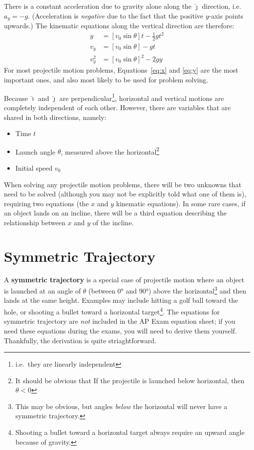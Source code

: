 \documentclass{../../../oss-handout}
\newcommand{\iii}{\bm{\hat{\imath}}}
\newcommand{\jjj}{\bm{\hat{\jmath}}}
\begin{document}
There is a constant acceleration due to gravity alone along the $\jjj$
direction, i.e.\ $a_y=-g$. (Acceleration is \emph{negative} due to the fact that
the positive $y$-axis points upwards.) The kinematic equations along the
vertical direction are therefore:
\begin{align}
  y &= \left[v_0\sin\theta\right]t-\frac12gt^2\label{eq:y}\\
  v_y &= \left[v_0\sin\theta\right] -gt\\
  v_y^2&=\left[v_0\sin\theta\right]^2-2gy
\end{align}
For most projectile motion problems, Equations~\ref{eq:x} and \ref{eq:y} are
the most important ones, and also most likely to be used for problem solving.

Because $\iii$ and $\jjj$ are perpendicular\footnote{i.e.\ they are linearly
  independent}, horizontal and vertical motions are completely independent of
each other. However, there are variables that are shared in both directions,
namely:
\begin{itemize}[nosep]
\item Time $t$
\item Launch angle $\theta$, measured above the horizontal\footnote{It should
  be obvious that If the projectile is launched below horizontal, then
  $\theta<0$}
\item Initial speed $v_0$
\end{itemize}
When solving any projectile motion problems, there will be two unknowns that
need to be solved (although you may not be explicitly told what one of them
is), requiring two equations (the $x$ and $y$ kinematic equations). In some
rare cases, if an object lands on an incline, there will be a third equation
describing the relationship between $x$ and $y$ of the incline.

\section{Symmetric Trajectory}
A \textbf{symmetric trajectory} is a special case of projectile motion where an
object is launched at an angle of $\theta$ (between \ang{0} and \ang{90}) above
the horizontal\footnote{This may be obvious, but angles \emph{below} the 
  horizontal will never have a symmetric trajectory.} and then lands at the
same height. Examples may include hitting a golf ball toward the hole, or
shooting a bullet toward a horizontal target\footnote{Shooting a bullet toward
  a horizontal target always require an upward angle because of gravity.}. The
equations for symmetric trajectory are \emph{not} included in the AP Exam
equation sheet; if you need these equations during the exams, you will need to
derive them yourself. Thankfully, the derivation is quite striaghtforward.
\end{document}
